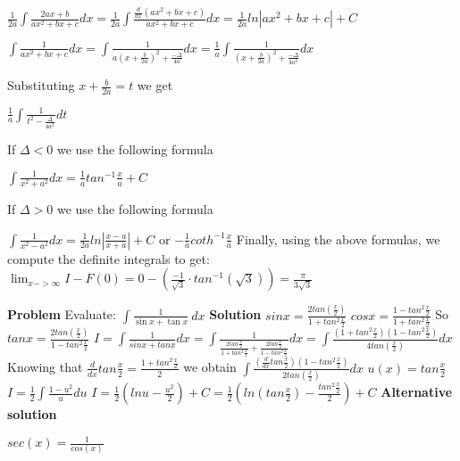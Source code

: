 \documentclass{article}
\begin{document}
{\begin{spacing}{\baselinestretch}
$\frac{1}{2a}\int\frac{2ax+b}{ax^2+bx+c}dx=\frac{1}{2a}\int\frac{\frac{d}{dx}(ax^2+bx+c)}{ax^2+bx+c}dx=\frac{1}{2a}ln|ax^2+bx+c|+C$

$\int\frac{1}{ax^2+bx+c}dx=\int\frac{1}{a\left(x+\frac{b}{2a}\right)^2+\frac{-\Delta}{4a}}dx=\frac{1}{a}\int\frac{1}{\left(x+\frac{b}{2a}\right)^2+\frac{-\Delta}{4a^2}}dx$

Substituting  $x+\frac{b}{2a}=t$ we get

$\frac{1}{a}\int\frac{1}{t^2-\frac{\Delta}{4a^2}}dt$

If $\Delta<0$ we use the following formula 

$\int\frac{1}{x^2+a^2}dx=\frac{1}{a}tan^{-1}\frac{x}{a}+C$

If $\Delta>0$ we use the following formula

$\int\frac{1}{x^2-a^2}dx=\frac{1}{2a}ln\left|\frac{x-a}{x+a}\right|+C$ or $-\frac{1}{a}coth^{-1}\frac{x}{a}$ \newline
Finally, using the above formulas, we compute the definite integrals to get:
$\lim_{x -> \infty} I-F(0)=0-(\frac{-1}{\sqrt3}\cdot tan^{-1}(\sqrt3))=\frac{\pi}{3\sqrt3}$


\newpage
\textbf{Problem}
\newline \newline
Evaluate: $\int \frac{1}{\sin x + \tan x}\ dx$
\newline \newline
\textbf{Solution}
\newline \newline
$sin x=\frac{2tan(\frac{x}{2})}{1+tan^2\frac{x}{2}}$
$cos x=\frac{1-tan^2\frac{x}{2}}{1+tan^2\frac{x}{2}}$
So $tan x=\frac{2tan(\frac{x}{2})}{1-tan^2\frac{x}{2}}$
$I=\int\frac{1}{sinx+tanx}dx=\int\frac{1}{\frac{2tan\frac{x}{2}}{1+tan^2\frac{x}{2}}+\frac{2tan\frac{x}{2}}{1-tan^2\frac{x}{2}}}dx=\int\frac{(1+tan^2\frac{x}{2})(1-tan^2\frac{x}{2})}{4tan(\frac{x}{2})}dx$
Knowing that $\frac{d}{dx}tan\frac{x}{2}=\frac{1+tan^2\frac{x}{2}}{2}$ we obtain
$\int\frac{(\frac{d}{dx}tan\frac{x}{2})(1-tan^2\frac{x}{2})}{2tan(\frac{x}{2})}dx$
$u(x)=tan\frac{x}{2}$
$I=\frac{1}{2}\int\frac{1-u^2}{u}du$
$I=\frac{1}{2}(lnu-\frac{u^2}{2})+C=\frac{1}{2}(ln(tan\frac{x}{2})-\frac{tan^2\frac{x}{2}}{2})+C$
\newline \newline
\textbf{Alternative solution}
\begin{flushleft}
\newline \newline
$sec(x)=\frac{1}{cos(x)}$


\end{flushleft}
\end{spacing}}
\end{document}
